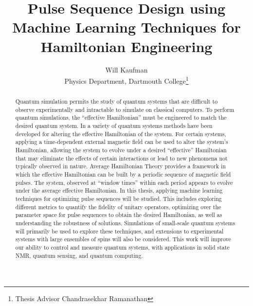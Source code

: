 \documentclass{article}
\title{Pulse Sequence Design using Machine Learning Techniques for Hamiltonian Engineering}
\author{Will Kaufman \\ Physics Department, Dartmouth College\thanks{Thesis Advisor Chandrasekhar Ramanathan}}
\begin{document}
\maketitle

\begin{abstract}




%
%
%
Quantum simulation permits the study of quantum systems that are difficult to observe experimentally and intractable to simulate on classical computers. To perform quantum simulations, the ``effective Hamiltonian'' must be engineered to match the desired quantum system.
In a variety of quantum systems methods have been developed for altering the effective Hamiltonian of the system.
For certain systems,
applying a time-dependent external magnetic field can be used to alter the system's Hamiltonian, allowing the system to evolve under a desired ``effective'' Hamiltonian that may eliminate the effects of certain interactions or lead to new phenomena not typically observed in nature. Average Hamiltonian Theory provides a framework in which the effective Hamiltonian can be built by a periodic sequence of magnetic field pulses. The system, observed at ``window times'' within each period appears to evolve under the average effective Hamiltonian.
In this thesis, applying machine learning techniques for optimizing pulse sequences will be studied. This includes exploring different metrics to quantify the fidelity of unitary operators, optimizing over the parameter space for pulse sequences to obtain the desired Hamiltonian, as well as understanding the robustness of solutions. Simulations of small-scale quantum systems will primarily be used to explore these techniques, and extensions to experimental systems with large ensembles of spins will also be considered.
This work will improve our ability to control and measure quantum systems, with applications in solid state NMR, quantum sensing, and quantum computing.

\end{abstract}
\end{document}
